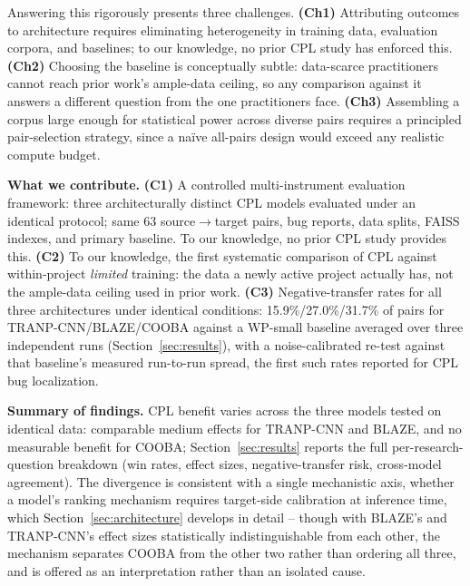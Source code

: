 \documentclass[a4paper,fleqn]{cas-dc}
\begin{document}
Answering this rigorously presents three challenges. \textbf{(Ch1)} Attributing outcomes to architecture requires eliminating heterogeneity in training data, evaluation corpora, and baselines; to our knowledge, no prior CPL study has enforced this. \textbf{(Ch2)} Choosing the baseline is conceptually subtle: data-scarce practitioners cannot reach prior work's ample-data ceiling, so any comparison against it answers a different question from the one practitioners face. \textbf{(Ch3)} Assembling a corpus large enough for statistical power across diverse pairs requires a principled pair-selection strategy, since a na\"{i}ve all-pairs design would exceed any realistic compute budget.


\begin{tcolorbox}[colback=white, colframe=black, title=\textbf{Contributions and Summary of Findings}]
\textbf{What we contribute.}
\textbf{(C1)} A controlled multi-instrument evaluation framework: three architecturally
distinct CPL models evaluated under an identical protocol; same 63 source$\to$target
pairs, bug reports, data splits, FAISS indexes, and primary baseline. To our knowledge,
no prior CPL study provides this.
\textbf{(C2)} To our knowledge, the first systematic comparison of CPL against within-project
\emph{limited} training: the data a newly active project actually has, not the
ample-data ceiling used in prior work.
\textbf{(C3)} Negative-transfer rates for all three architectures under
identical conditions: 15.9\%/27.0\%/31.7\% of pairs for
TRANP-CNN/BLAZE/COOBA against a WP-small baseline averaged over three
independent runs (Section~\ref{sec:results}), with a noise-calibrated
re-test against that baseline's measured run-to-run spread, the first
such rates reported for CPL bug localization.

\textbf{Summary of findings.} CPL benefit varies across the three
models tested on identical data: comparable medium effects for TRANP-CNN and
BLAZE, and no measurable benefit for COOBA; Section~\ref{sec:results} reports the full
per-research-question breakdown (win rates, effect sizes, negative-transfer risk,
cross-model agreement). The divergence is consistent with a single mechanistic axis,
whether a model's ranking mechanism requires target-side calibration at inference
time, which Section~\ref{sec:architecture} develops in detail -- though with
BLAZE's and TRANP-CNN's effect sizes statistically indistinguishable from
each other, the mechanism separates COOBA from the other two rather than
ordering all three, and is offered as an interpretation rather than an isolated cause.
\end{tcolorbox}
\end{document}
